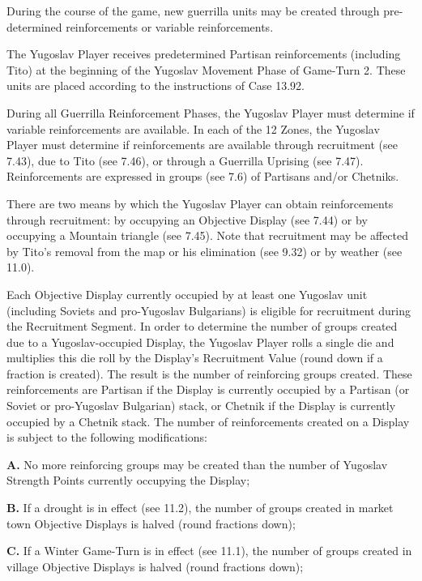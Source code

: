 During the course of the game, new guerrilla units may be created through pre-determined reinforcements or variable reinforcements.

 The Yugoslav Player receives predetermined Partisan reinforcements (including Tito) at the beginning of the Yugoslav Movement Phase of Game-Turn 2. These units are placed according to the instructions of Case 13.92.

 During all Guerrilla Reinforcement Phases, the Yugoslav Player must determine if variable reinforcements are available. In each of the 12 Zones, the Yugoslav Player must determine if reinforcements are available through recruitment (see 7.43), due to Tito (see 7.46), or through a Guerrilla Uprising (see 7.47). Reinforcements are expressed in groups (see 7.6) of Partisans and/or Chetniks.

 There are two means by which the Yugoslav Player can obtain reinforcements through recruitment: by occupying an Objective Display (see 7.44) or by occupying a Mountain triangle (see 7.45). Note that recruitment may be affected by Tito’s removal from the map or his elimination (see 9.32) or by weather (see 11.0).

 Each Objective Display currently occupied by at least one Yugoslav unit (including Soviets and pro-Yugoslav Bulgarians) is eligible for recruitment during the Recruitment Segment. In order to determine the number of groups created due to a Yugoslav-occupied Display, the Yugoslav Player rolls a single die and multiplies this die roll by the Display’s Recruitment Value (round down if a fraction is created). The result is the number of reinforcing groups created. These reinforcements are Partisan if the Display is currently occupied by a Partisan (or Soviet or pro-Yugoslav Bulgarian) stack, or Chetnik if the Display is currently occupied by a Chetnik stack. The number of reinforcements created on a Display is subject to the following modifications:

\textbf{A.} No more reinforcing groups may be created than the number of Yugoslav Strength Points currently occupying the Display;

\textbf{B.} If a drought is in effect (see 11.2), the number of groups created in market town Objective Displays is halved (round fractions down);

\textbf{C.} If a Winter Game-Turn is in effect (see 11.1), the number of groups created in village Objective Displays is halved (round fractions down);


